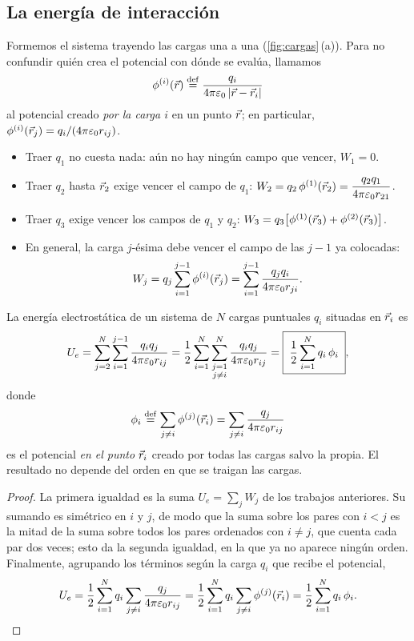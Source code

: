 \subsection{La energía de interacción}

Formemos el sistema trayendo las cargas una a una (\cref{fig:cargas}\,(a)). Para no confundir quién crea el potencial con dónde se evalúa,
llamamos
\begin{equation}\label{eq:phi-de-i}
  \phi^{(i)}(\vec r)\mathrel{\overset{\mathrm{def}}{=}}\frac{q_i}{4\pi\varepsilon_0\left\lvert \vec r-\vec r_i\right\rvert}
\end{equation}
al potencial creado \emph{por la carga $i$} en un punto $\vec r$; en particular, $\phi^{(i)}(\vec r_j)=q_i/(4\pi\varepsilon_0 r_{ij})$.
\begin{itemize}
  \item Traer $q_1$ no cuesta nada: aún no hay ningún campo que vencer, $W_1=0$.
  \item Traer $q_2$ hasta $\vec r_2$ exige vencer el campo de $q_1$: $W_2=q_2\,\phi^{(1)}(\vec r_2)=\dfrac{q_2q_1}{4\pi\varepsilon_0 r_{21}}$.
  \item Traer $q_3$ exige vencer los campos de $q_1$ y $q_2$: $W_3=q_3\big[\phi^{(1)}(\vec r_3)+\phi^{(2)}(\vec r_3)\big]$.
  \item En general, la carga $j$-ésima debe vencer el campo de las $j-1$ ya colocadas:
        \[
          W_j=q_j\sum_{i=1}^{j-1}\phi^{(i)}(\vec r_j)=\sum_{i=1}^{j-1}\frac{q_jq_i}{4\pi\varepsilon_0 r_{ji}} .
        \]
\end{itemize}



\begin{proposicion}\label{prop:puntuales}
La energía electrostática de un sistema de $N$ cargas puntuales $q_i$ situadas en $\vec r_i$ es
\begin{equation}\label{eq:puntuales}
  U_e=\sum_{j=2}^{N}\sum_{i=1}^{j-1}\frac{q_iq_j}{4\pi\varepsilon_0 r_{ij}}
     =\frac12\sum_{i=1}^{N}\sum_{\substack{j=1\\ j\neq i}}^{N}\frac{q_iq_j}{4\pi\varepsilon_0 r_{ij}}
     =\boxed{\;\frac12\sum_{i=1}^{N}q_i\,\phi_i\;},
\end{equation}
donde
\[
  \phi_i\mathrel{\overset{\mathrm{def}}{=}}\sum_{j\neq i}\phi^{(j)}(\vec r_i)=\sum_{j\neq i}\frac{q_j}{4\pi\varepsilon_0 r_{ij}}
\]
es el potencial \emph{en el punto} $\vec r_i$ creado por todas las cargas salvo la propia. El resultado
no depende del orden en que se traigan las cargas.
\end{proposicion}

\begin{proof}
La primera igualdad es la suma $U_e=\sum_jW_j$ de los trabajos anteriores. Su sumando es simétrico en $i$ y $j$, de modo que
la suma sobre los pares con $i<j$ es la mitad de la suma sobre todos los pares ordenados con $i\neq j$, que cuenta cada par dos
veces; esto da la segunda igualdad, en la que ya no aparece ningún orden. Finalmente, agrupando los términos según la carga $q_i$ que recibe el potencial,
\[
  U_e=\frac12\sum_{i=1}^Nq_i\sum_{j\neq i}\frac{q_j}{4\pi\varepsilon_0 r_{ij}}=\frac12\sum_{i=1}^Nq_i\sum_{j\neq i}\phi^{(j)}(\vec r_i)=\frac12\sum_{i=1}^Nq_i\,\phi_i . \qedhere
\]
\end{proof}

